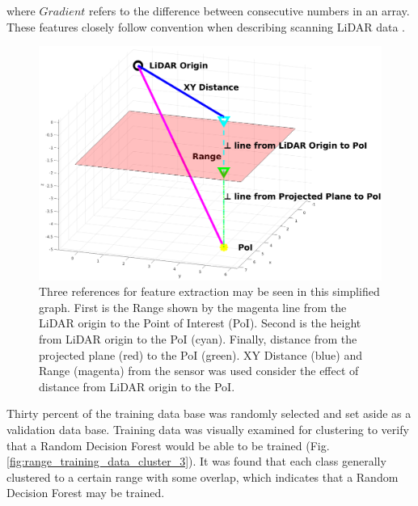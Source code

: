 \documentclass[numbered,pdftex]{ohio-etd}
\begin{document}
{{{{				{where $Gradient$ refers to the difference between consecutive numbers in an array. These features closely follow convention when describing scanning LiDAR data \cite{breiman_random_2001}.}
				
				
				\begin{figure}[H]
					\centering
					\includegraphics[width=1\linewidth]{Defense_Images/xy_vs_range}
					\caption[XY vs Range vs Z Height]{Three references for feature extraction may be seen in this simplified graph. First is the Range shown by the magenta line from the LiDAR origin to the Point of Interest (PoI). Second is the height from  LiDAR origin to the PoI (cyan). Finally, distance from the projected plane (red) to the PoI (green). XY Distance (blue) and Range (magenta) from the sensor was used consider the effect of distance from LiDAR origin to the PoI.}
					\label{fig:xy_vs_range}
				\end{figure}
			
				{Thirty percent of the training data base was randomly selected and set aside as a validation data base. Training data was visually examined for clustering to verify that a Random Decision Forest would be able to be trained (Fig. \ref{fig:range_training_data_cluster_3}). It was found that each class generally clustered to a certain range with some overlap, which indicates that a Random Decision Forest may be trained.}
				
}}}}
\end{document}
